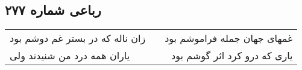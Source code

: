 \begin{center}
\section*{رباعی شماره ۲۷۷}
\label{sec:sh277}
\begin{longtable}{l p{0.5cm} r}
زان ناله که در بستر غم دوشم بود
&&
غمهای جهان جمله فراموشم بود
\\
یاران همه درد من شنیدند ولی
&&
یاری که درو کرد اثر گوشم بود
\\
\end{longtable}
\end{center}
